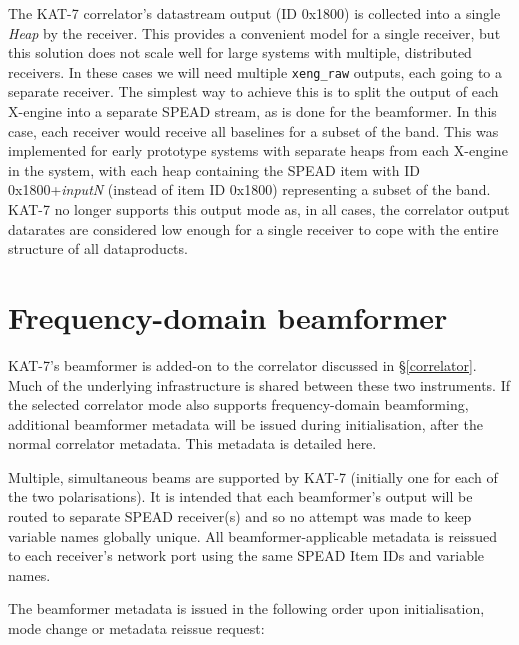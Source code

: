 \documentclass[11pt,english,twoside]{article}
\begin{document}
The KAT-7 correlator's datastream output (ID 0x1800) is collected into a single \emph{Heap} by the receiver. This provides a convenient model
for a single receiver, but this solution does not scale well for large systems with multiple, distributed receivers. In these cases we will need
multiple {\tt xeng\_raw} outputs, each going to a separate receiver. The simplest way to achieve this is to split the output of each X-engine
into a separate SPEAD stream, as is done for the beamformer. In this case, each receiver would receive all baselines for a subset of the band.
This was implemented for early prototype systems with separate heaps from each X-engine in the system, with each heap containing the SPEAD item
with ID 0x1800+\emph{inputN} (instead of item ID 0x1800) representing a subset of the band. KAT-7 no longer supports this output mode as, in all
cases, the correlator output datarates are considered low enough for a single receiver to cope with the entire structure of all dataproducts.

\section{Frequency-domain beamformer}
KAT-7's beamformer is added-on to the correlator discussed in \S\ref{correlator}. Much of the underlying infrastructure is shared between these
two instruments. If the selected correlator mode also supports frequency-domain beamforming, additional beamformer metadata will be issued
during initialisation, after the normal correlator metadata. This metadata is detailed here.

Multiple, simultaneous beams are supported by KAT-7 (initially one for each of the two polarisations). It is intended that each beamformer's
output will be routed to separate SPEAD receiver(s) and so no attempt was made to keep variable names globally unique. All beamformer-applicable
metadata is reissued to each receiver's network port using the same SPEAD Item IDs and variable names.

The beamformer metadata is issued in the following order upon initialisation, mode change or metadata reissue request:
\end{document}

